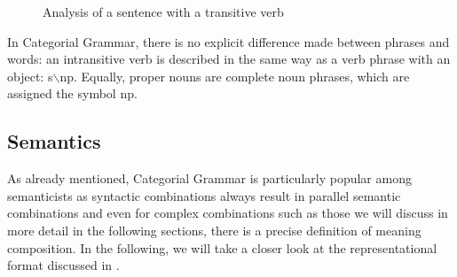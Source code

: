 \begin{figure}
\centerline{%
}
\caption{\label{abb-the-cat-chased-Mary}Analysis of a sentence with a transitive verb}
\end{figure}%

\noindent
In Categorial Grammar, there is no explicit difference made between phrases and words: an intransitive verb is described in the same way as a verb phrase with an
object:  s$\backslash$np. Equally, proper nouns are complete noun phrases, which are assigned the symbol np.\is{$\backslash$|)}

\subsection{Semantics}

As already mentioned, Categorial Grammar is particularly popular among semanticists as syntactic
combinations always result in parallel semantic combinations and even for complex combinations such
as those we will discuss in more detail in the following sections, there is a precise definition of
meaning composition.
In the following, we will take a closer look at the representational format discussed in \citet[Section~2.1.2]{Steedman97a}.

